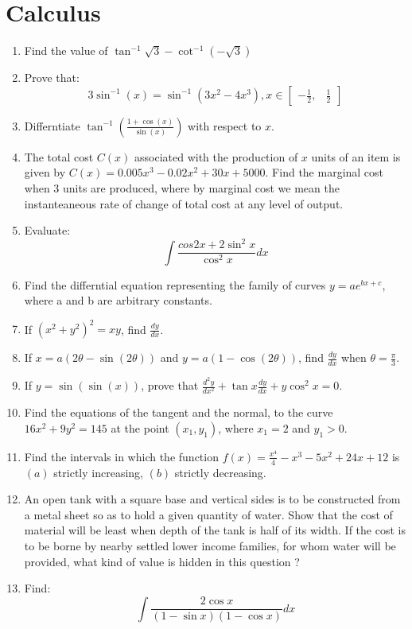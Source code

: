\documentclass{article}
\providecommand{\brak}[1]{\ensuremath{\left(#1\right)}}
\begin{document}
\section{Calculus}
\begin{enumerate}
\item Find the value of $\tan^{-1}\sqrt{3}-\cot^{-1}\brak{-\sqrt{3}}$
\item Prove that:\[3\sin^{-1}\brak{x}=\sin^{-1}\brak{3x^{2}-4x^{3}}, x \in \begin{bmatrix}
	-\frac{1}{2}, & \frac{1}{2}
\end{bmatrix}\]
\item Differntiate $\tan^{-1} \brak{\frac{1+\cos(x)}{\sin(x)}}$ with respect to  $x$.
\item The total cost $C\brak{x}$ associated with the production of $x$ units of an item is given by $C\brak{x} = 0.005x^{3} - 0.02x^{2} + 30x + 5000$. Find the marginal cost when 3 units are produced, where by marginal cost we mean the instanteaneous rate of change of total cost at any level of output.
\item Evaluate: \[\int \frac{cos 2x + 2\sin^{2} x}{\cos^{2}x} dx\]
\item Find the differntial equation representing the family of curves $y=ae^{bx+c}$, where a and b are arbitrary constants.
\item If $\brak{x^{2}+y^{2}}^{2}=xy$, find $\frac{dy}{dx}$.
\item If $x=a\brak{2\theta - \sin \brak{2\theta}}$ and $y=a\brak{1-\cos\brak{2\theta}}$, find $\frac{dy}{dx}$
when $\theta = \frac{\pi}{3}$.
\item If $y=\sin \brak{\sin \brak{x}}$, prove that $\frac{d^{2}y}{dx^{2}}+\tan x \frac{dy}{dx}+y\cos^{2}x=0$.
\item Find the equations of the tangent and the normal, to the curve $16x^{2}+9y^{2}=145$ at the point $\brak{x_{1},y_{1}}$, where $x_{1}=2$ and $y_{1}>0$.
\item Find the intervals in which the function $f\brak{x} =\frac{x^{4}}{4}-x^{3}-5x^{2} + 24x + 12$ is \brak{a} strictly increasing, \brak{b} strictly decreasing.
\item An open tank with a square base and vertical sides is to be constructed from a metal sheet so as to hold a given quantity of water. Show that the cost of material will be least when depth of the tank is half of its width. If the cost is to be borne by nearby settled lower income families, for whom water will be provided, what kind of value is hidden in this question ?  	
\item Find: \[ \int \frac{2\cos x}{\brak{1-\sin x}\brak{1-\cos x}}dx \]

\end{enumerate}
\end{document}
